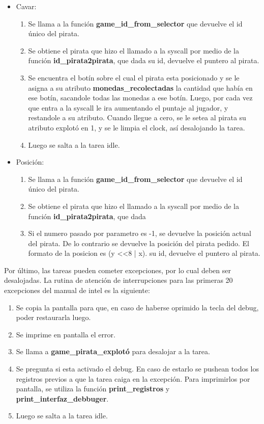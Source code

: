 \documentclass[a4paper,10pt]{article}
\begin{document}
\begin{itemize}
    \item Cavar:
      \begin{enumerate}
        \item Se llama a la función \textbf{game\_id\_from\_selector} que devuelve el id único del pirata.
        \item Se obtiene el pirata que hizo el llamado a la syscall por medio de la función \textbf{id\_pirata2pirata}, que dada
          su id, devuelve el puntero al pirata.
        \item Se encuentra el botín sobre el cual el pirata esta posicionado y se le asigna a su atributo
          \textbf{monedas\_recolectadas} la cantidad que había en ese botín, sacandole todas las monedas a ese botín. Luego, por cada vez que 
          entra a la syscall le ira aumentando el puntaje al jugador, y restandole a su atributo.
          Cuando llegue a cero, se le setea al pirata su atributo explotó en 1, y se le limpia
          el clock, así desalojando la tarea.
        \item Luego se salta a la tarea idle.
      \end{enumerate}
    \item Posición:
      \begin{enumerate}
        \item Se llama a la función \textbf{game\_id\_from\_selector} que devuelve el id único del pirata.
        \item Se obtiene el pirata que hizo el llamado a la syscall por medio de la función \textbf{id\_pirata2pirata}, que dada
        \item Si el numero pasado por parametro es -1, se devuelve la posición actual del pirata. De lo
          contrario se devuelve la posición del pirata pedido. El formato de la posicion es 
          (y <<8 | x).
          su id, devuelve el puntero al pirata.
      \end{enumerate}
  \end{itemize}

  Por último, las tareas pueden cometer excepciones, por lo cual deben ser desalojadas. La rutina de atención
  de interrupciones para las primeras 20 excepciones del manual de intel es la siguiente:
  \begin{enumerate}
    \item Se copia la pantalla para que, en caso de haberse oprimido la tecla del debug, poder restaurarla luego.
    \item Se imprime en pantalla el error.
    \item Se llama a \textbf{game\_pirata\_explotó} para desalojar a la tarea.
    \item Se pregunta si esta activado el debug. En caso de estarlo se pushean todos los registros previos a que
      la tarea caiga en la excepción. Para imprimirlos por pantalla, se utiliza la función \textbf{print\_registros} y \textbf{print\_interfaz\_debbuger}.
    \item Luego se salta a la tarea idle.
  \end{enumerate}
\end{document}

